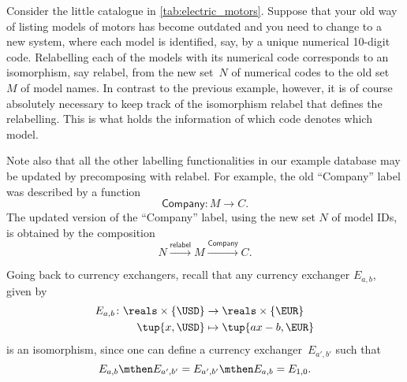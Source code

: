 
\begin{example}[Relabelling]
Consider the little catalogue in \cref{tab:electric_motors}. Suppose that your old way of listing models of motors has become outdated and you need to change to a new system, where each model is identified, say, by a unique numerical 10-digit code. Relabelling each of the models with its numerical code corresponds to an isomorphism, say \textsf{relabel}, from the new set~$N$ of numerical codes to the old set~$M$ of model names. In contrast to the previous example, however, it is of course absolutely necessary to keep track of the isomorphism \textsf{relabel} that defines the relabelling. This is what holds the information of which code denotes which model.

Note also that all the other labelling functionalities in our example database may be updated by precomposing with \textsf{relabel}. For example, the old ``Company'' label was described by a function
\begin{equation*}
\textsf{Company}\colon M \to C.
\end{equation*}
The updated version of the ``Company'' label, using the new set $N$ of model IDs, is obtained by the composition
\begin{equation*}
N \overset{\textsf{relabel}}{\longrightarrow} M \overset{\textsf{Company}}{\longrightarrow} C.
\end{equation*}
\end{example}

\begin{example}
Going back to currency exchangers, recall that any currency exchanger $E_{a,b}$, given by
\begin{equation*}
\begin{aligned}
E_{a,b}\colon \reals\times \{\USD\}&\to \reals\times \{\EUR\}\\
\tup{x,\USD}&\mapsto \tup{ax-b,\EUR}
\end{aligned}
\end{equation*}
is an isomorphism, since one can define a currency exchanger~$E_{a',b'}$ such that
\begin{equation*}
E_{a,b}\mthen E_{a',b'}=E_{a',b'}\mthen E_{a,b}=E_{1,0}.
\end{equation*}
\end{example}



